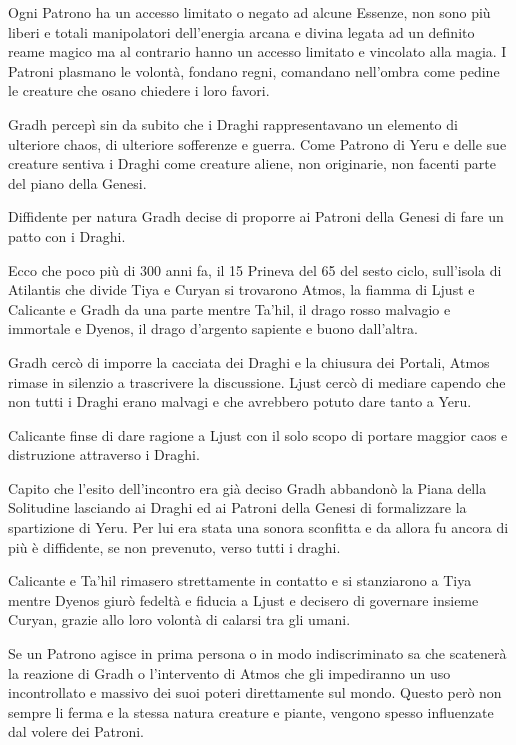 \documentclass[a4paper,11pt,twoside,openany]{book}
\begin{document}
Ogni Patrono ha un accesso limitato o negato ad alcune Essenze, non sono più liberi e totali manipolatori dell'energia arcana e divina legata ad un definito reame magico ma al contrario hanno un accesso limitato e vincolato alla magia.
I Patroni plasmano le volontà, fondano regni, comandano nell'ombra come pedine le creature che osano chiedere i loro favori.

Gradh percepì sin da subito che i Draghi rappresentavano un elemento di ulteriore chaos, di ulteriore sofferenze e guerra. Come Patrono di Yeru e delle sue creature sentiva i Draghi come creature aliene, non originarie, non facenti parte del piano della Genesi.

Diffidente per natura Gradh decise di proporre ai Patroni della Genesi di fare un patto con i Draghi.

Ecco che poco più di 300 anni fa, il 15 Prineva del 65 del sesto ciclo, sull'isola di Atilantis che divide Tiya e Curyan si trovarono Atmos, la fiamma di Ljust e Calicante e Gradh da una parte mentre Ta'hil, il drago rosso malvagio e immortale e Dyenos, il drago d'argento sapiente e buono dall'altra.

Gradh cercò di imporre la cacciata dei Draghi e la chiusura dei Portali, Atmos rimase in silenzio a trascrivere la discussione. Ljust cercò di mediare capendo che non tutti i Draghi erano malvagi e che avrebbero potuto dare tanto a Yeru.

Calicante finse di dare ragione a Ljust con il solo scopo di portare maggior caos e distruzione attraverso i Draghi.

Capito che l'esito dell'incontro era già deciso Gradh abbandonò la Piana della Solitudine lasciando ai Draghi ed ai Patroni della Genesi di formalizzare la spartizione di Yeru. Per lui era stata una sonora sconfitta e da allora fu ancora di più è diffidente, se non prevenuto, verso tutti i draghi.

Calicante e Ta'hil rimasero strettamente in contatto e si stanziarono a Tiya mentre Dyenos giurò fedeltà e fiducia a Ljust e decisero di governare insieme Curyan, grazie allo loro volontà di calarsi tra gli umani.

Se un Patrono agisce in prima persona o in modo indiscriminato sa che scatenerà la reazione di Gradh o l'intervento di Atmos che gli impediranno un uso incontrollato e massivo dei suoi poteri direttamente sul mondo. Questo però non sempre li ferma e la stessa natura creature e piante, vengono spesso influenzate dal volere dei Patroni.
\end{document}
